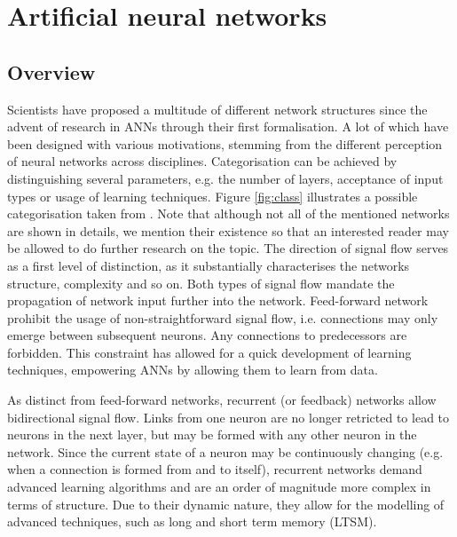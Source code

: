 \documentclass[10pt,a4paper,DIV=11]{scrreprt}
\begin{document}
\chapter{Artificial neural networks}
\label{ch:ann}
\section{Overview}

Scientists have proposed a multitude of different network structures since the advent of research in ANNs through their first formalisation. 
A lot of which have been designed with various motivations, stemming from the different perception of neural networks across disciplines.
Categorisation can be achieved by distinguishing several parameters, e.g. the number of layers, acceptance of input types or usage of learning techniques.
Figure \ref{fig:class} illustrates a possible categorisation taken from \cite{NNGER}. Note that although not all of the mentioned networks are shown in details,
we mention their existence so that an interested reader may be allowed to do further research on the topic.
The direction of signal flow serves as a first level of distinction, as it substantially characterises the networks structure, complexity and so on.
Both types of signal flow mandate the propagation of network input further into the network.
Feed-forward network prohibit the usage of non-straightforward signal flow, i.e. connections may only emerge between subsequent neurons.
Any connections to predecessors are forbidden. This constraint has allowed for a quick development of learning techniques, empowering ANNs by 
allowing them to learn from data. 


As distinct from feed-forward networks, recurrent (or feedback) networks allow bidirectional signal flow. 
Links from one neuron are no longer retricted to lead to neurons in the next layer, but may be formed with any other neuron in the network.
Since the current state of a neuron may be continuously changing (e.g. when a connection is formed from and to itself), recurrent networks 
demand advanced learning algorithms and are an order of magnitude more complex in terms of structure. Due to their dynamic nature, they allow 
for the modelling of advanced techniques, such as long and short term memory (LTSM).\cite{LTSM}
\end{document}
